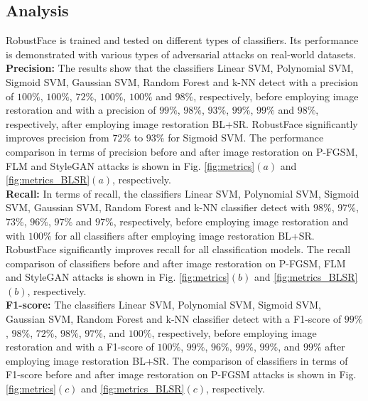 \documentclass[sn-mathphys]{sn-jnl}%
\theoremstyle{thmstyleone}%
\theoremstyle{thmstyletwo}%
\theoremstyle{thmstylethree}%
\begin{document}
\subsection{Analysis}
RobustFace is trained and tested on different types of classifiers. Its performance is demonstrated with various types of adversarial attacks on real-world datasets. \\
\textbf{Precision:} The results show that the classifiers Linear SVM, Polynomial SVM, Sigmoid SVM, Gaussian SVM, Random Forest and k-NN detect with a precision of $100\%$, $100\%$, $72\%$, $100\%$, $100\%$ and $98\%$, respectively, before employing image restoration and with a precision of $99\%$, $98\%$, $93\%$, $99\%$, $99\%$ and $98\%$, respectively, after employing image restoration BL+SR. RobustFace significantly improves precision from $72\%$ to $93\%$ for Sigmoid SVM. The performance comparison in terms of precision before and after image restoration on P-FGSM, FLM and StyleGAN attacks is shown in Fig. \ref{fig:metrics}$(a)$ and \ref{fig:metrics_BLSR}$(a)$, respectively.\\
\textbf{Recall:} In terms of recall, the classifiers Linear SVM, Polynomial SVM, Sigmoid SVM, Gaussian SVM, Random Forest and k-NN classifier detect with $98\%$, $97\%$, $73\%$, $96\%$, $97\%$ and $97\%$, respectively, before employing image restoration and with $100\%$ for all classifiers after employing image restoration BL+SR. RobustFace significantly improves recall for all classification models. The recall comparison of classifiers before and after image restoration on P-FGSM, FLM and StyleGAN attacks is shown in Fig. \ref{fig:metrics}$(b)$ and \ref{fig:metrics_BLSR}$(b)$, respectively.\\
\textbf{F1-score:} The classifiers Linear SVM, Polynomial SVM, Sigmoid SVM, Gaussian SVM, Random Forest and k-NN classifier detect with a F1-score of $99\%$, $98\%$, $72\%$, $98\%$, $97\%$, and $100\%$, respectively, before employing image restoration and with a F1-score of $100\%$, $99\%$, $96\%$, $99\%$, $99\%$, and $99\%$ after employing image restoration BL+SR. The comparison of classifiers in terms of F1-score before and after image restoration on P-FGSM attacks is shown in Fig. \ref{fig:metrics}$(c)$ and \ref{fig:metrics_BLSR}$(c)$, respectively.\\
\end{document}
